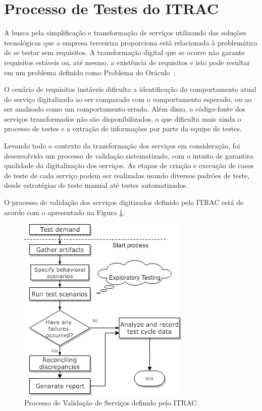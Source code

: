 \section{Processo de Testes do ITRAC}

A busca pela simplificação  e transformação de serviços utilizando das soluções tecnológicas que a empresa terceiriza proporciona está relacionada à problemática de se testar sem requisitos. A transformação digital que se ocorre não garante requisitos estáveis ou, até mesmo, a existência de requisitos e isto pode resultar em um problema definido como Problema do Oráculo~\cite{barr2015oracle}. 

O cenário de requisitos instáveis dificulta a identificação do comportamento atual do serviço digitalizado ao ser comparado com o comportamento esperado, ou ao ser analisado como um comportamento errado.  Além disso, o código-fonte dos serviços transformados não são disponibilizados, o que dificulta mais ainda o processo de testes e a extração de informações por parte da equipe de testes.

Levando todo o contexto da transformação dos serviços em consideração, foi desenvolvido um processo de validação sistematizado, com o intuito de garantira qualidade da digitalização dos serviços. As etapas de criação e execução de casos de teste de cada serviço podem ser realizadas usando diversos padrões de teste, desde estratégias de teste manual até testes automatizados. 

O processo de validação dos serviços digitizados  definido pelo ITRAC está de acordo com o apresentado na Figura \ref{img:process_test}.
 
 \begin{figure}[!htb]
 \centering
\includegraphics[width=.6\textwidth]{figuras/Processo_artigo_menor.png}
\caption{Processo de Validação de Serviços definido pelo ITRAC.}
\label{img:process_test}
\end{figure}

